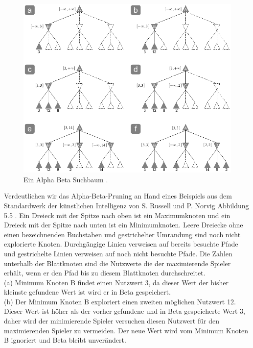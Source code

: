 \begin{figure}[!htbp]
  \centering
  \includegraphics[scale = 0.8]{inhalt/abbildungen/alpha_beta_suchbaum.pdf}
  \caption{Ein Alpha Beta Suchbaum \cite[213]{Russell}.}
  \label{fig:minimax_tictactoe}
\end{figure} 

Verdeutlichen wir das Alpha-Beta-Pruning an Hand eines Beispiels aus dem Standardwerk der künstlichen Intelligenz von S. Russell und P. Norvig Abbildung 5.5 \cite[213]{Russell}. Ein Dreieck mit der Spitze nach oben ist ein Maximumknoten und ein Dreieck mit der Spitze nach unten ist ein Minimumknoten. Leere Dreiecke ohne einen bezeichnenden Buchstaben und gestrichelter Umrandung sind noch nicht explorierte Knoten. Durchgängige Linien verweisen auf bereits besuchte Pfade und gestrichelte Linien verweisen auf noch nicht besuchte Pfade. Die Zahlen unterhalb der Blattknoten sind die Nutzwerte die der maximierende Spieler erhält, wenn er den Pfad bis zu diesem Blattknoten durchschreitet. \\

(a) Minimum Knoten B findet einen Nutzwert 3, da dieser Wert der bisher kleinste gefundene Wert ist wird er in Beta gespeichert. \\

(b) Der Minimum Knoten B exploriert einen zweiten möglichen Nutzwert 12. Dieser Wert ist höher als der vorher gefundene und in Beta gespeicherte Wert 3, daher wird der minimierende Spieler versuchen diesen Nutzwert für den maximierenden Spieler zu vermeiden. Der neue Wert wird vom Minimum Knoten B ignoriert und Beta bleibt unverändert. \\

